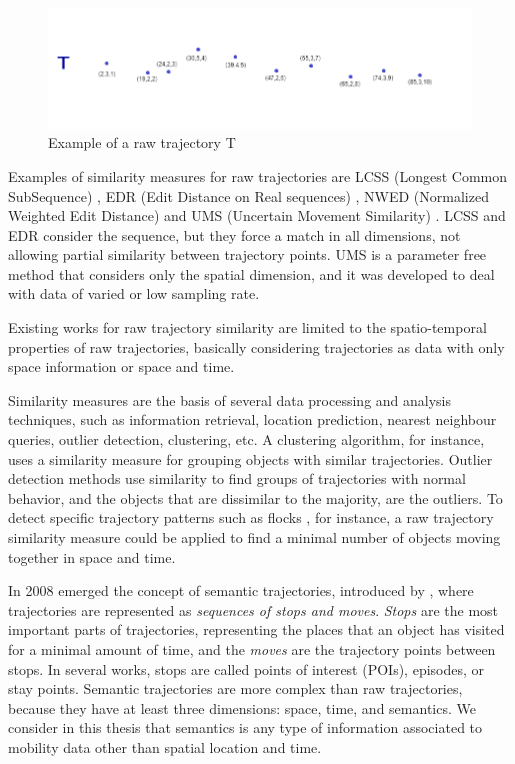 \begin{figure}[ht]
\centering
\includegraphics[width=1.0\textwidth]{Images/example_raw-trajectory.png}
\caption{Example of a raw trajectory T}
\label{fig:example_raw_trajectory}
\end{figure}

Examples of similarity measures for raw trajectories are LCSS (Longest Common SubSequence) \cite{vlachos2002discovering}, EDR (Edit Distance on Real sequences) \cite{Chen:2005:RFS:1066157.1066213}, NWED (Normalized Weighted Edit Distance) \cite{dodge2012} and UMS (Uncertain Movement Similarity) \cite{Furtado-UMS-2018}. LCSS and EDR consider the sequence, but they force a match in all dimensions, not allowing partial similarity between trajectory points.
UMS is a parameter free method that considers only the spatial dimension, and it was developed to deal with data of varied or low sampling rate.

Existing works for raw trajectory similarity are limited to the spatio-temporal properties of raw trajectories, basically considering trajectories as data with only space information or space and time.

Similarity measures are the basis of several data processing and analysis techniques, such as information retrieval, location prediction, nearest neighbour queries, outlier detection, clustering, etc. A clustering algorithm, for instance, uses a similarity measure for grouping objects with similar trajectories. Outlier detection methods use similarity to find groups of trajectories with normal behavior, and the objects that are dissimilar to the majority, are the outliers. To detect specific trajectory patterns such as flocks \cite{Laube2005}, for instance, a raw trajectory similarity measure could be applied to find a minimal number of objects moving together in space and time.

In 2008 emerged the concept of semantic trajectories, introduced by \cite{Spaccapietra:2008:CVT:1347466.1347785}, where trajectories are represented as \emph{sequences of stops and moves}. \emph{Stops} are the most important parts of trajectories, representing the places that an object has visited for a minimal amount of time, and the \emph{moves} are the trajectory points between stops. In several works, stops are called points of interest (POIs), episodes, or stay points. Semantic trajectories are more complex than raw trajectories, because they have at least three dimensions: space, time, and semantics. We consider in this thesis that semantics is any type of information associated to mobility data other than spatial location and time.


